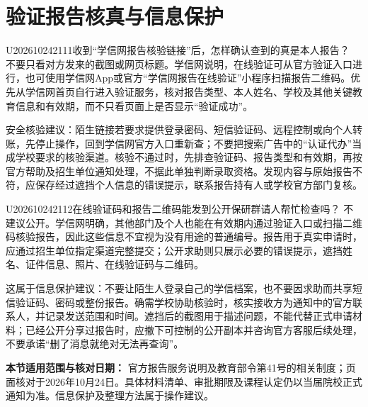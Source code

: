 \section{验证报告核真与信息保护}
\begin{qa}{U202610242111}{收到“学信网报告核验链接”后，怎样确认查到的真是本人报告？}
不要只看对方发来的截图或网页标题。学信网说明，在线验证可从官方验证入口进行，也可使用学信网App或官方“学信网报告在线验证”小程序扫描报告二维码。优先从学信网首页自行进入验证服务，核对报告类型、本人姓名、学校及其他关键教育信息和有效期，而不只看页面上是否显示“验证成功”。

安全核验建议：陌生链接若要求提供登录密码、短信验证码、远程控制或向个人转账，先停止操作，回到学信网官方入口重新查；不要把搜索广告中的“认证代办”当成学校要求的核验渠道。核验不通过时，先排查验证码、报告类型和有效期，再按官方帮助及招生单位通知处理，不据此单独判断录取资格。发现内容与原始报告不符，应保存经过遮挡个人信息的错误提示，联系报告持有人或学校官方部门复核。
\end{qa}
\begin{qa}{U202610242112}{在线验证码和报告二维码能发到公开保研群请人帮忙检查吗？}
不建议公开。学信网明确，其他部门及个人也能在有效期内通过验证入口或扫描二维码核验报告，因此这些信息不宜视为没有用途的普通编号。报告用于真实申请时，应通过招生单位指定渠道完整提交；公开求助则只展示必要的错误提示，遮挡姓名、证件信息、照片、在线验证码与二维码。

这属于信息保护建议：不要让陌生人登录自己的学信档案，也不要因求助而共享短信验证码、密码或整份报告。确需学校协助核验时，核实接收方为通知中的官方联系人，并记录发送范围和时间。遮挡后的截图用于描述问题，不能代替正式申请材料；已经公开分享过报告时，应撤下可控制的公开副本并咨询官方客服后续处理，不要承诺“删了消息就绝对无法再查询”。
\end{qa}
\par\textbf{本节适用范围与核对日期：} 官方报告服务说明及教育部令第41号的相关制度；页面核对于2026年10月24日。具体材料清单、审批期限及课程认定仍以当届院校正式通知为准。信息保护及整理方法属于操作建议。

